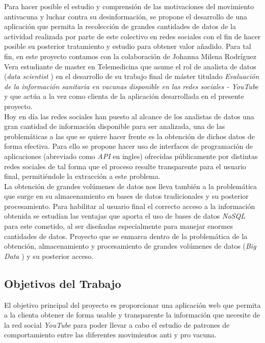 \documentclass[11pt,a4paper]{article}
\begin{document}
Para hacer posible el estudio y comprensión de las motivaciones del movimiento antivacuna y luchar contra su desinformación, se propone el desarrollo de una aplicación que permita la recolección de grandes cantidades de datos de la actividad realizada por parte de este colectivo en redes sociales con el fin de hacer posible su posterior tratamiento y estudio para obtener valor añadido. Para tal fin, en este proyecto contamos con la colaboración de Johanna Milena Rodríguez Vera estudiante de master en Telemedicina que asume el rol de analista de datos (\textit{data scientist} \cite{4}) en el desarrollo de su trabajo final de máster titulado \textit{Evaluación de la información sanitaria en vacunas disponible en las redes sociales - YouTube} y que actúa a la vez como clienta de la aplicación desarrollada en el presente proyecto.
\\

Hoy en día las redes sociales han puesto al alcance de los analistas de datos una gran cantidad de información disponible para ser analizada, una de las problemáticas a las que se quiere hacer frente es la obtención de dichos datos de forma efectiva. Para ello se propone hacer uso de interfaces de programación de aplicaciones (abreviado como \textit{API} \cite{5} en ingles) ofrecidas públicamente por distintas redes sociales de tal forma que el proceso resulte transparente para el usuario final, permitiéndole la extracción a este problema.
\\

La obtención de grandes volúmenes de datos nos lleva también a la problemática que surge en su almacenamiento en bases de datos tradicionales y su posterior procesamiento. Para habilitar al usuario final el correcto acceso a la información obtenida se estudían las ventajas que aporta el uso de bases de datos \textit{NoSQL} \cite{6} para este cometido, al ser diseñadas especialmente para manejar enormes cantidades de datos. Proyecto que se enmarca dentro de la problemática de la obtención, almacenamiento y procesamiento de grandes volúmenes de datos (\textit{Big Data} \cite{7}) y su posterior acceso.
\newpage

\subsection{Objetivos del Trabajo}\label{objectivos} 
El objetivo principal del proyecto es proporcionar una aplicación web que permita a la clienta obtener de forma usable y transparente la información que necesite de la red social \textit{YouTube} para poder llevar a cabo el estudio de patrones de comportamiento entre las diferentes movimientos anti y pro vacuna.
\\
\end{document}
